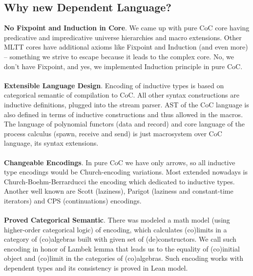 \documentclass[11pt,oneside]{article}
\begin{document}
\subsection{Why new Dependent Language?}
\vspace{0.3cm}
{\bf No Fixpoint and Induction in Core}. We came up with pure CoC core having predicative
and impredicative universe hierarchies and macro extensions. Other MLTT cores have additional
axioms like Fixpoint and Induction (and even more) -- something we strive to escape
because it leads to the complex core. No, we don't have Fixpoint, and yes,
we implemented Induction principle in pure CoC.

\paragraph{}
{\bf Extensible Language Design}. Encoding of inductive types is based on categorical semantic
of compilation to CoC. All other syntax constructions are inductive definitions, plugged
into the stream parser. AST of the CoC language is also defined in terms of inductive
constructions and thus allowed in the macros. The language of polynomial functors (data
and record) and core language of the process calculus (spawn, receive and send) is just
macrosystem over CoC language, its syntax extensions.

\paragraph{}
{\bf Changeable Encodings}. In pure CoC we have only arrows, so all inductive type encodings
would be Church-encoding variations. Most extended nowadays is Church-Boehm-Berrarducci
the encoding which dedicated to inductive types. Another well known are Scott (laziness),
Parigot (laziness and constant-time iterators) and CPS (continuations) encodings.

\paragraph{}
{\bf Proved Categorical Semantic}. There was modeled a math model (using higher-order
categorical logic) of encoding, which calculates (co)limits in a category of (co)algebras
built with given set of (de)constructors. We call such encoding in honor of Lambek lemma
that leads us to the equality of (co)initial object and (co)limit in the categories
of (co)algebras. Such encoding works with dependent types and its consistency is proved
in Lean model.
\end{document}
